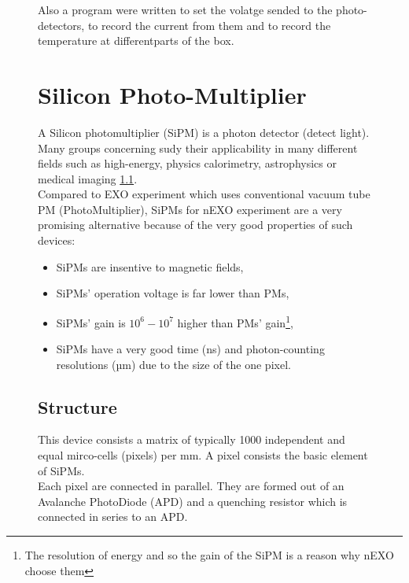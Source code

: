 \begin{figure}[!hbtp]
  Also a program were written to set the volatge sended to the photo-detectors, to record the current from them and to record the 
  temperature at differentparts of the box. 
  
  \section{Silicon Photo-Multiplier}
  
  A Silicon photomultiplier (SiPM) is a photon detector (detect light). Many groups concerning sudy their applicability in many different 
  fields such as high-energy, physics calorimetry, astrophysics or medical imaging \ref{}.\\
  Compared to EXO experiment which uses conventional vacuum tube PM (PhotoMultiplier), SiPMs for nEXO experiment are a very promising 
  alternative because of the very good properties of such devices:
  
  \begin{itemize}
   \item SiPMs are insentive to magnetic fields,
   \item SiPMs' operation voltage is far lower than PMs,
   \item SiPMs' gain is \(10^6 - 10^7\) higher than PMs' gain\footnote{The resolution of energy and so the gain of the SiPM is a 
   reason why nEXO choose them},
   \item SiPMs have a very good time (ns) and photon-counting resolutions (µm) due to the size of the one pixel.
  \end{itemize}

  
  \subsection{Structure}
  
  This device consists a matrix of typically 1000 independent and equal mirco-cells (pixels) per mm\texttwosuperior{}. A pixel consists the basic 
  element of SiPMs.\\
  Each pixel are connected in parallel. They are formed out of an Avalanche PhotoDiode (APD) and a quenching resistor which is 
  connected in series to an APD. 
  

\end{figure}
